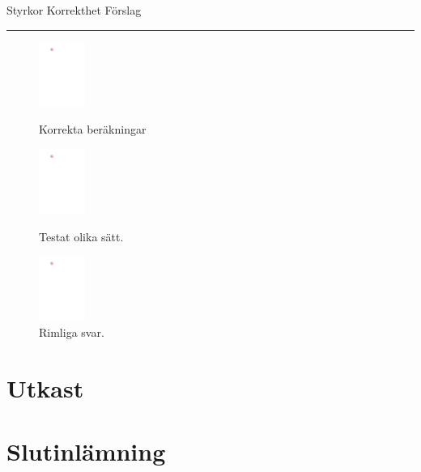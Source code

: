 \begin{questions}
\noindent Styrkor \hfill Korrekthet \hfill Förslag \hrule
\begin{figure}[H]
  \centering
  \includegraphics[width=1.5cm, page=8]{img/Bilder.pdf}
  \caption*{Korrekta beräkningar}
  \includegraphics[width=1.5cm, page=9]{img/Bilder.pdf}
  \caption*{Testat olika sätt.}
  \includegraphics[width=1.5cm, page=10]{img/Bilder.pdf}
  \caption*{Rimliga svar.}

\end{figure}
\newpage
\section*{Utkast}
\newpage
{}
\newpage
\section*{Slutinlämning}
\newpage
{}


\end{questions}

